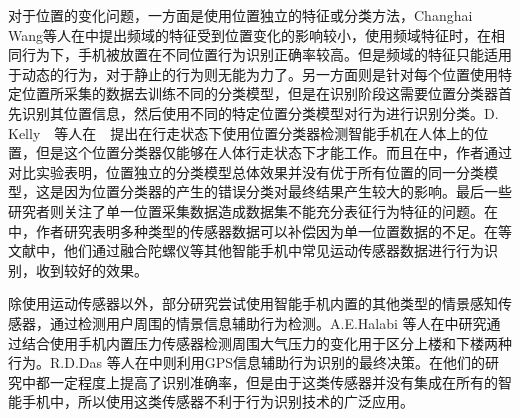 \par 对于位置的变化问题，一方面是使用位置独立的特征或分类方法，Changhai Wang等人在\cite{frequencyForPosition}中提出频域的特征受到位置变化的影响较小，使用频域特征时，在相同行为下，手机被放置在不同位置行为识别正确率较高。但是频域的特征只能适用于动态的行为，对于静止的行为则无能为力了。另一方面则是针对每个位置使用特定位置所采集的数据去训练不同的分类模型，但是在识别阶段这需要位置分类器首先识别其位置信息，然后使用不同的特定位置分类模型对行为进行识别分类。D. Kelly　等人在\cite{positionClassifier}　提出在行走状态下使用位置分类器检测智能手机在人体上的位置，但是这个位置分类器仅能够在人体行走状态下才能工作。而且在\cite{positionClassifierProblem}中，作者通过对比实验表明，位置独立的分类模型总体效果并没有优于所有位置的同一分类模型，这是因为位置分类器的产生的错误分类对最终结果产生较大的影响。最后一些研究者则关注了单一位置采集数据造成数据集不能充分表征行为特征的问题。在\cite{otherSensorCompensate}中，作者研究表明多种类型的传感器数据可以补偿因为单一位置数据的不足。在\cite{othersensorInstance1}\cite{othersensorInstance2}等文献中，他们通过融合陀螺仪等其他智能手机中常见运动传感器数据进行行为识别，收到较好的效果。
\par 除使用运动传感器以外，部分研究尝试使用智能手机内置的其他类型的情景感知传感器，通过检测用户周围的情景信息辅助行为检测。A.E.Halabi 等人在\cite{pressureSensor}中研究通过结合使用手机内置压力传感器检测周围大气压力的变化用于区分上楼和下楼两种行为。R.D.Das 等人在\cite{gps}中则利用GPS信息辅助行为识别的最终决策。在他们的研究中都一定程度上提高了识别准确率，但是由于这类传感器并没有集成在所有的智能手机中，所以使用这类传感器不利于行为识别技术的广泛应用。

